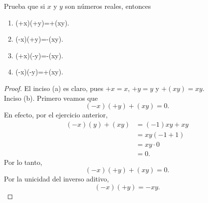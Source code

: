 \documentclass[12pt,a4paper]{book}
\begin{document}
    \begin{ejercicio}
        Prueba que si $x$ y $y$ son números reales, entonces
        \begin{enumerate}
            \item[(a)] (+x)(+y)=+(xy).
            \item[(b)] (-x)(+y)=-(xy).
            \item[(c)] (+x)(-y)=-(xy).
            \item[(d)] (-x)(-y)=+(xy).   
        \end{enumerate}
    \end{ejercicio}

    \begin{proof}
        El inciso (a) es claro, pues $+x=x$, $+y=y$ y $+(xy)=xy$.\\
        Inciso (b). Primero veamos que
        \begin{equation*}
            (-x)(+y)+(xy)=0.
        \end{equation*}
        En efecto, por el ejercicio anterior,
        \begin{align*}
            (-x)(y)+(xy)&=(-1)xy+xy\\
            &=xy(-1+1)\\
            &=xy\cdot0\\
            &=0.
        \end{align*}
        Por lo tanto,
        \begin{equation*}
            (-x)(+y)+(xy)=0.
        \end{equation*}
        Por la unicidad del inverso aditivo,
        \begin{equation*}
            (-x)(+y)=-xy.
        \end{equation*}
    \end{proof}
\end{document}
